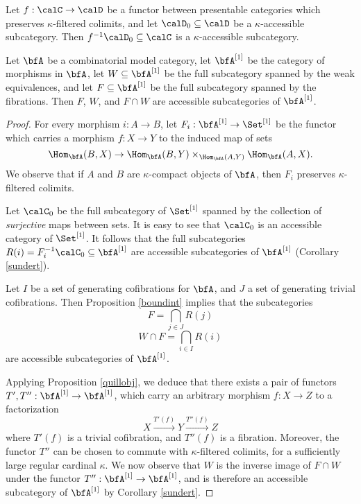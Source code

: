 \begin{corollary}\label{sundert}
Let $f: \calC \rightarrow \calD$ be a functor between presentable categories which preserves $\kappa$-filtered colimits, and let $\calD_0 \subseteq \calD$ be a $\kappa$-accessible subcategory. Then $f^{-1} \calD_0 \subseteq \calC$ is a $\kappa$-accessible subcategory.
\end{corollary}

\begin{corollary}[Smith]\label{smitty}
Let $\bfA$ be a combinatorial model category, let $\bfA^{[1]}$ be the category of morphisms in $\bfA$, let $W \subseteq \bfA^{[1]}$ be the full subcategory spanned by the weak equivalences, and let
$F \subseteq \bfA^{[1]}$ be the full subcategory spanned by the fibrations. Then
$F$, $W$, and $F \cap W$ are accessible subcategories of $\bfA^{[1]}$. 
\end{corollary}

\begin{proof}
For every morphism $i: A \rightarrow B$, let $F_i: \bfA^{[1]} \rightarrow \Set^{[1]}$ be the functor which carries a morphism $f: X \rightarrow Y$ to the induced map of sets
$$ \Hom_{\bfA}(B, X) \rightarrow \Hom_{\bfA}(B,Y) \times_{ \Hom_{\bfA}(A,Y) } \Hom_{\bfA}(A,X).$$
We observe that if $A$ and $B$ are $\kappa$-compact objects of $\bfA$, then $F_i$ preserves $\kappa$-filtered colimits.

Let $\calC_0$ be the full subcategory of $\Set^{[1]}$ spanned by the collection of {\em surjective} maps between sets. It is easy to see that $\calC_0$ is an accessible category of $\Set^{[1]}$. It follows that the full subcategories $R(i) = F_i^{-1} \calC_0 \subseteq \bfA^{[1]}$ are accessible subcategories of $\bfA^{[1]}$ (Corollary \ref{sundert}). 

Let $I$ be a set of generating cofibrations for $\bfA$, and $J$ a set of generating trivial cofibrations. Then Proposition \ref{boundint} implies that the subcategories
$$ F = \bigcap_{j \in J} R(j)$$
$$ W \cap F = \bigcap_{i \in I} R(i)$$
are accessible subcategories of $\bfA^{[1]}$. 

Applying Proposition \ref{quillobj}, we deduce that there exists a pair of functors
$T', T'': \bfA^{[1]} \rightarrow \bfA^{[1]}$, which carry an arbitrary morphism $f: X \rightarrow Z$ to a factorization
$$ X \stackrel{ T'(f) }{\rightarrow} Y \stackrel{T''(f)}{\rightarrow} Z$$
where $T'(f)$ is a trivial cofibration, and $T''(f)$ is a fibration. Moreover, the functor $T''$ can be chosen to commute with $\kappa$-filtered colimits, for a sufficiently large regular cardinal $\kappa$. We now observe that $W$ is the inverse image of $F \cap W$ under the functor
$T'': \bfA^{[1]} \rightarrow \bfA^{[1]}$, and is therefore an accessible subcategory of
$\bfA^{[1]}$ by Corollary \ref{sundert}.
\end{proof}

